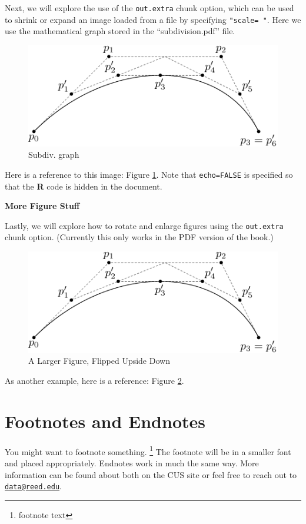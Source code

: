 \documentclass[12pt,twoside]{reedthesis}
\begin{document}
Next, we will explore the use of the \texttt{out.extra} chunk option, which can be used to shrink or expand an image loaded from a file by specifying \texttt{"scale=\ "}. Here we use the mathematical graph stored in the ``subdivision.pdf'' file.
\begin{figure}
\includegraphics[scale=0.75]{figure/subdivision} \caption{Subdiv. graph}\label{fig:subd}
\end{figure}
Here is a reference to this image: Figure \ref{fig:subd}. Note that \texttt{echo=FALSE} is specified so that the \textbf{R} code is hidden in the document.

\textbf{More Figure Stuff}

Lastly, we will explore how to rotate and enlarge figures using the \texttt{out.extra} chunk option. (Currently this only works in the PDF version of the book.)
\begin{figure}
\includegraphics[angle=180, scale=1.1]{figure/subdivision} \caption{A Larger Figure, Flipped Upside Down}\label{fig:subd2}
\end{figure}
As another example, here is a reference: Figure \ref{fig:subd2}.

\hypertarget{footnotes-and-endnotes}{%
\section{Footnotes and Endnotes}\label{footnotes-and-endnotes}}

You might want to footnote something. \footnote{footnote text} The footnote will be in a smaller font and placed appropriately. Endnotes work in much the same way. More information can be found about both on the CUS site or feel free to reach out to \href{mailto:data@reed.edu}{\nolinkurl{data@reed.edu}}.
\end{document}
